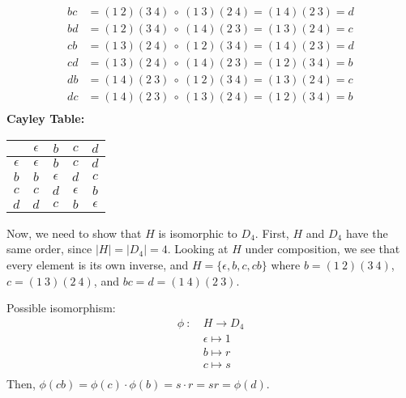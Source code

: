 \begin{problem}
\begin{enumalph}
\begin{Answer}
\begin{enumalph}
          \noindent
          \begin{align*}
            bc &= (1\ 2)(3\ 4)\ \circ\ (1\ 3)(2\ 4) = (1\ 4)(2\ 3) = d \\
            bd &= (1\ 2)(3\ 4)\ \circ\ (1\ 4)(2\ 3) = (1\ 3)(2\ 4) = c \\
            cb &= (1\ 3)(2\ 4)\ \circ\ (1\ 2)(3\ 4) = (1\ 4)(2\ 3) = d \\
            cd &= (1\ 3)(2\ 4)\ \circ\ (1\ 4)(2\ 3) = (1\ 2)(3\ 4) = b \\
            db &= (1\ 4)(2\ 3)\ \circ\ (1\ 2)(3\ 4) = (1\ 3)(2\ 4) = c \\
            dc &= (1\ 4)(2\ 3)\ \circ\ (1\ 3)(2\ 4) = (1\ 2)(3\ 4) = b \\
          \end{align*}
          \textbf{Cayley Table:}
          \begin{center}
            \begin{tabular}{ c c c c c}
              \toprule
              & $\epsilon$ & $b$ & $c$ & $d$ \\
              \midrule
              $\epsilon$ & $\epsilon$ & $b$ & $c$ & $d$ \\
              $b$ & $b$ & $\epsilon$ & $d$ & $c$ \\
              $c$ & $c$ & $d$ & $\epsilon$ & $b$ \\
              $d$ & $d$ & $c$ & $b$ & $\epsilon$ \\
              \bottomrule
            \end{tabular}
          \end{center}
      \end{enumalph}
      Now, we need to show that $H$ is isomorphic to $D_4$.
      First, $H$ and $D_4$ have the same order, since $|H| = |D_4| = 4$.
      Looking at $H$ under composition, we see that every element is its own inverse,
      and $H = \{\epsilon, b, c, cb\}$
      where $b = (1\ 2)(3\ 4)$, $c = (1\ 3)(2\ 4)$, and $bc = d = (1\ 4)(2\ 3)$.
      
      
      \noindent
      Possible isomorphism:
      \begin{align*}
        \phi\ \colon\ &H \to D_4 \\
        &\epsilon \mapsto 1 \\
        &b \mapsto r \\
        &c \mapsto s \\
      \end{align*}
      Then, $\phi(cb) = \phi(c)\cdot\phi(b) = s\cdot r = sr = \phi(d)$.


\end{Answer}
\end{enumalph}
\end{problem}
